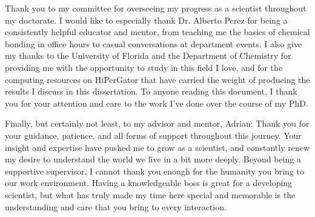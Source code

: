 Thank you to my committee for overseeing my progress as a scientist throughout my doctorate.
I would like to especially thank Dr. Alberto Perez for being a consistently helpful educator and mentor, from teaching me the basics of chemical bonding in office hours to casual conversations at department events.
I also give my thanks to the University of Florida and the Department of Chemistry for providing me with the opportunity to study in this field I love, and for the computing resources on HiPerGator that have carried the weight of producing the results I discuss in this dissertation.
To anyone reading this document, I thank you for your attention and care to the work I've done over the course of my PhD.

Finally, but certainly not least, to my advisor and mentor, Adrian: Thank you for your guidance, patience, and all forms of support throughout this journey.
Your insight and expertise have pushed me to grow as a scientist, and constantly renew my desire to understand the world we live in a bit more deeply. 
Beyond being a supportive supervisor, I cannot thank you enough for the humanity you bring to our work environment. 
Having a knowledgeable boss is great for a developing scientist, but what has truly made my time here special and memorable is the understanding and care that you bring to every interaction. 
